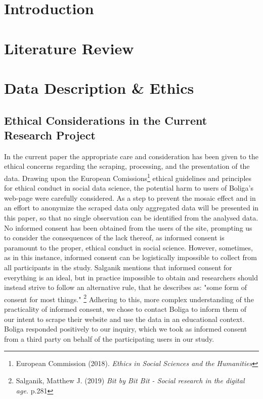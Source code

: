 \documentclass[12pt,a4paper]{article}
\begin{document}

\newpage
\onehalfspacing

\tableofcontents
\newpage
\section{Introduction}

\section{Literature Review}

\section{Data Description \& Ethics}

\subsection{Ethical Considerations in the Current Research Project}
In the current paper the appropriate care and consideration has been given to the ethical concerns regarding the scraping, processing, and the presentation of the data. Drawing upon the European Comissions\footnote{European Commission (2018). \textit{Ethics in Social Sciences and the Humanities}} ethical guidelines and principles for ethical conduct in social data science, the potential harm to users of Boliga's web-page were carefully considered. As a step to prevent the mosaic effect and in an effort to anonymize the scraped data only aggregated data will be presented in this paper, so that no single observation can be identified from the analysed data.\newline
No informed consent has been obtained from the users of the site, prompting us to consider the consequences of the lack thereof, as informed consent is paramount to the proper, ethical conduct in social science. However, sometimes, as in this instance, informed consent can be logistically impossible to collect from all participants in the study. Salganik mentions that informed consent for everything is an ideal, but in practice impossible to obtain and researchers should instead strive to follow an alternative rule, that he describes as: "some form of consent for most things." \footnote{Salganik, Matthew J. (2019) \textit{Bit by Bit Bit - Social research in the digital age.} p.281} Adhering to this, more complex  understanding of the practicality of informed consent, we chose to contact Boliga to inform them of our intent to scrape their website and use the data in an educational context. Boliga responded positively to our inquiry, which we took as informed consent from a third party on behalf of the participating users in our study.\newline
\end{document}
